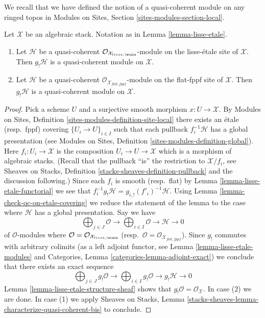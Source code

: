 \noindent
We recall that we have defined the notion of a quasi-coherent module on
any ringed topos in
Modules on Sites, Section \ref{sites-modules-section-local}.

\begin{lemma}
\label{lemma-shriek-quasi-coherent}
Let $\mathcal{X}$ be an algebraic stack. Notation as in
Lemma \ref{lemma-lisse-etale}.
\begin{enumerate}
\item Let $\mathcal{H}$ be a quasi-coherent
$\mathcal{O}_{\mathcal{X}_{lisse,\etale}}$-module 
on the lisse-\'etale site of $\mathcal{X}$. Then $g_!\mathcal{H}$ is a
quasi-coherent module on $\mathcal{X}$.
\item Let $\mathcal{H}$ be a quasi-coherent
$\mathcal{O}_{\mathcal{X}_{flat,fppf}}$-module 
on the flat-fppf site of $\mathcal{X}$. Then $g_!\mathcal{H}$ is a
quasi-coherent module on $\mathcal{X}$.
\end{enumerate}
\end{lemma}

\begin{proof}
Pick a scheme $U$ and a surjective smooth morphism $x : U \to \mathcal{X}$.
By
Modules on Sites, Definition \ref{sites-modules-definition-site-local}
there exists an \'etale (resp.\ fppf) covering
$\{U_i \to U\}_{i \in I}$ such that each pullback $f_i^{-1}\mathcal{H}$
has a global presentation (see
Modules on Sites, Definition \ref{sites-modules-definition-global}).
Here $f_i : U_i \to \mathcal{X}$ is the composition
$U_i \to U \to \mathcal{X}$ which is a morphism of algebraic stacks.
(Recall that the pullback ``is'' the restriction to $\mathcal{X}/f_i$, see
Sheaves on Stacks, Definition \ref{stacks-sheaves-definition-pullback}
and the discussion following.) Since each $f_i$ is smooth (resp.\ flat) by
Lemma \ref{lemma-lisse-etale-functorial}
we see that $f_i^{-1}g_!\mathcal{H} = g_{i, !}(f'_i)^{-1}\mathcal{H}$.
Using Lemma \ref{lemma-check-qc-on-etale-covering}
we reduce the statement of the lemma to the case where $\mathcal{H}$
has a global presentation. Say we have
$$
\bigoplus\nolimits_{j \in J} \mathcal{O} \longrightarrow
\bigoplus\nolimits_{i \in I} \mathcal{O} \longrightarrow
\mathcal{H} \longrightarrow 0
$$
of $\mathcal{O}$-modules where
$\mathcal{O} = \mathcal{O}_{\mathcal{X}_{lisse,\etale}}$
(resp.\ $\mathcal{O} = \mathcal{O}_{\mathcal{X}_{flat,fppf}}$).
Since $g_!$ commutes with arbitrary colimits (as a left adjoint functor, see
Lemma \ref{lemma-lisse-etale-modules} and
Categories, Lemma \ref{categories-lemma-adjoint-exact})
we conclude that there exists an exact sequence
$$
\bigoplus\nolimits_{j \in J} g_!\mathcal{O} \longrightarrow
\bigoplus\nolimits_{i \in I} g_!\mathcal{O} \longrightarrow
g_!\mathcal{H} \longrightarrow 0
$$
Lemma \ref{lemma-lisse-etale-structure-sheaf}
shows that $g_!\mathcal{O} = \mathcal{O}_\mathcal{X}$.
In case (2) we are done. In case (1) we apply
Sheaves on Stacks, Lemma
\ref{stacks-sheaves-lemma-characterize-quasi-coherent-bis}
to conclude.
\end{proof}

